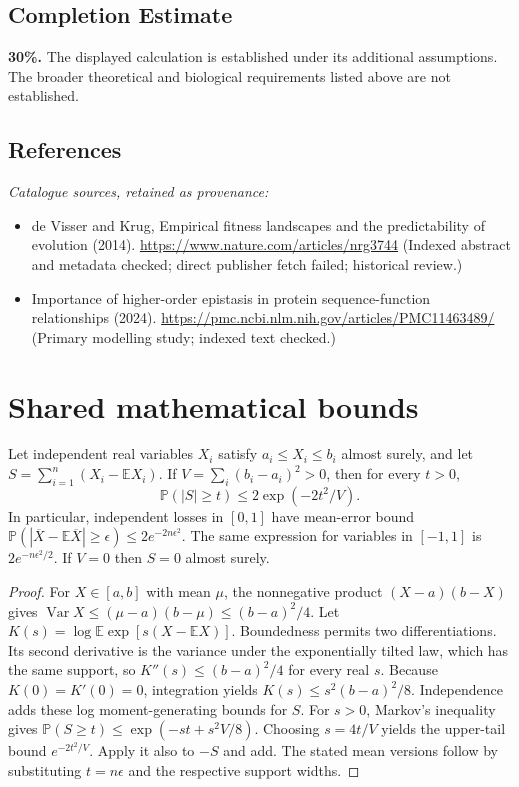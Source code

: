 \documentclass[11pt]{article}
\begin{document}
\subsection{Completion Estimate}
\textbf{30\%.} The displayed calculation is established under its additional assumptions. The broader theoretical and biological requirements listed above are not established.
\subsection{References}
\noindent\emph{Catalogue sources, retained as provenance:}
\begin{itemize}
\item de Visser and Krug, Empirical fitness landscapes and the predictability of evolution (2014). \url{https://www.nature.com/articles/nrg3744} (Indexed abstract and metadata checked; direct publisher fetch failed; historical review.)
\item Importance of higher-order epistasis in protein sequence-function relationships (2024). \url{https://pmc.ncbi.nlm.nih.gov/articles/PMC11463489/} (Primary modelling study; indexed text checked.)
\end{itemize}




\section{Shared mathematical bounds}\label{app:bounds}
\begin{lemma}\label{lem:bounded}
Let independent real variables $X_i$ satisfy $a_i\leq X_i\leq b_i$ almost surely,
and let $S=\sum_{i=1}^n(X_i-\mathbb{E} X_i)$. If
$V=\sum_i(b_i-a_i)^2>0$, then for every $t>0$,
\[
 \mathbb{P}(|S|\geq t)\leq 2\exp(-2t^2/V).
\]
In particular, independent losses in $[0,1]$ have mean-error bound
$\mathbb{P}(|\overline X-\mathbb{E}\overline X|\geq\epsilon)
\leq2e^{-2n\epsilon^2}$. The same expression for variables in $[-1,1]$
is $2e^{-n\epsilon^2/2}$. If $V=0$ then $S=0$ almost surely.
\end{lemma}
\begin{proof}
For $X\in[a,b]$ with mean $\mu$, the nonnegative product
$(X-a)(b-X)$ gives
$\operatorname{Var} X\leq(\mu-a)(b-\mu)\leq(b-a)^2/4$.
Let $K(s)=\log\mathbb{E}\exp[s(X-\mathbb{E} X)]$.
Boundedness permits two differentiations. Its second derivative is the variance
under the exponentially tilted law, which has the same support, so
$K''(s)\leq(b-a)^2/4$ for every real $s$.
Because $K(0)=K'(0)=0$, integration yields
$K(s)\leq s^2(b-a)^2/8$.
Independence adds these log moment-generating bounds for $S$.
For $s>0$, Markov's inequality gives
$\mathbb{P}(S\geq t)\leq\exp(-st+s^2V/8)$.
Choosing $s=4t/V$ yields the upper-tail bound $e^{-2t^2/V}$.
Apply it also to $-S$ and add. The stated mean versions follow by substituting
$t=n\epsilon$ and the respective support widths.
\end{proof}
\end{document}

